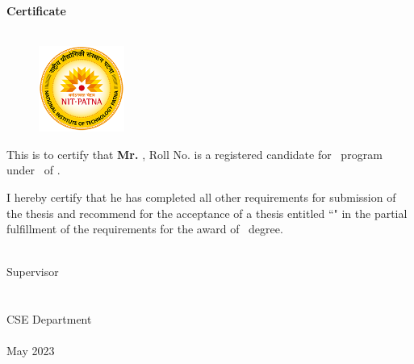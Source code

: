 \begin{center}
    \huge\textbf{Certificate}\\
    \MakeUppercase{\Large{\collegefullname}}\\
    \Large{\department}
\end{center}
\vspace{0.5cm}
\begin{figure}[H]
    \centering
    \includegraphics[width=0.25\textwidth]{"figures/college_logo.png"}
\end{figure}
\vspace{0.5cm}

This is to certify that \textbf{Mr. \cMembThree}, Roll No. \textbf{\cMembThreeRoll} is a registered candidate for \courseShort\ program under \department\ of \collegefullname.

I hereby certify that he has completed all other requirements for submission of the thesis and recommend for the acceptance of a thesis entitled ``\textbf{\projectname}" in the partial fulfillment of the requirements for the award of \courseShort\ degree. 


\vspace{2cm}

\begin{minipage}[t]{0.45\textwidth}
    \begin{flushleft}
        {\underline{\hspace{5cm}}}\\
        Supervisor\\
        \guidename\\
        \guideDesignation \\
        CSE Department\\
        \collegefullname\\
        May 2023
    \end{flushleft}
\end{minipage}

